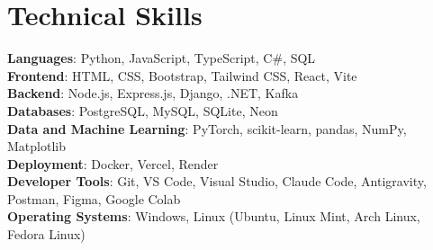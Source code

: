 \documentclass[letterpaper,11pt]{article}
\begin{document}
\section{Technical Skills}
 \begin{itemize}[leftmargin=0.15in, label={}]
    \small{\item{
     \textbf{Languages}{: Python, JavaScript, TypeScript, C\#, SQL} \\
     \textbf{Frontend}{: HTML, CSS, Bootstrap, Tailwind CSS, React, Vite} \\
     \textbf{Backend}{: Node.js, Express.js, Django, .NET, Kafka} \\
     \textbf{Databases}{: PostgreSQL, MySQL, SQLite, Neon} \\
     \textbf{Data and Machine Learning}{: PyTorch, scikit-learn, pandas, NumPy, Matplotlib} \\
     \textbf{Deployment}{: Docker, Vercel, Render} \\
     \textbf{Developer Tools}{: Git, VS Code, Visual Studio, Claude Code, Antigravity, Postman, Figma, Google Colab} \\
     \textbf{Operating Systems}{: Windows, Linux (Ubuntu, Linux Mint, Arch Linux, Fedora Linux)}
    }}
 \end{itemize}


\end{document}
